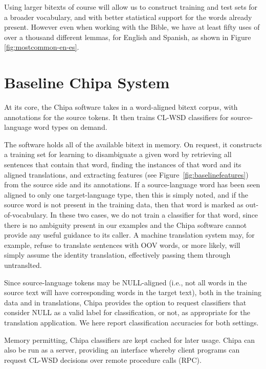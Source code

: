 Using larger bitexts of course will allow us to construct training and test
sets for a broader vocabulary, and with better statistical support for the
words already present. However even when working with the Bible, we
have at least fifty uses of over a thousand different lemmas, for English and
Spanish, as shown in Figure \ref{fig:mostcommon-en-es}.


\section{Baseline Chipa System}
At its core, the Chipa software takes in a word-aligned bitext corpus, with
annotations for the source tokens. It then trains CL-WSD classifiers for
source-language word types on demand. 

The software holds all of the available bitext in memory. On request, it
constructs a training set for learning to disambiguate a given word
by retrieving all sentences that contain that word,
finding the instances of that word and its aligned translations, and extracting
features (see Figure~\ref{fig:baselinefeatures}) from the source side and its
annotations.
If a source-language word has been seen aligned to only one target-language
type, then this is simply noted, and if the source word is not present in the
training data, then that word is marked as out-of-vocabulary. In these two
cases, we do not train a classifier for that word, since there is no
ambiguity present in our examples and the Chipa software cannot provide any
useful guidance to its caller. A machine translation system may, for example,
refuse to translate sentences with OOV words, or more likely, will simply
assume the identity translation, effectively passing them through untranslted.

Since source-language tokens may be NULL-aligned (i.e., not all words in the
source text will have corresponding words in the target text), both in the
training data and in translations, Chipa provides the option to request
classifiers that consider NULL as a valid label for classification, or not, as
appropriate for the translation application. We here report classification
accuracies for both settings.

Memory permitting, Chipa classifiers are kept cached for later usage. Chipa can
also be run as a server, providing an interface whereby client programs can
request CL-WSD decisions over remote procedure calls (RPC).

